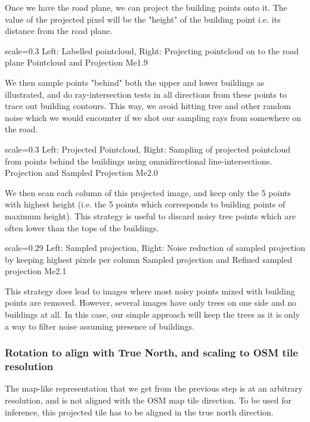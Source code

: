 Once we have the road plane, we can project the building points onto it. The value of the projected pixel will be the "height" of the building point i.e. its distance from the road plane. 

{scale=0.3}%
{Left: Labelled pointcloud, Right: Projecting pointcloud on to the road plane}%
{Pointcloud and Projection}%
{Me1.9}

We then sample points "behind" both the upper and lower buildings as illustrated, and do ray-intersection tests in all directions from these points to trace out building contours. This way, we avoid hitting tree and other random noise which we would encounter if we shot our sampling rays from somewhere on the road. 

{scale=0.3}%
{Left: Projected Pointcloud, Right: Sampling of projected pointcloud from points behind the buildings using omnidirectional line-intersections.}%
{Projection and Sampled Projection}%
{Me2.0}

We then scan each column of this projected image, and keep only the 5 points with highest height (i.e. the 5 points which corresponds to building points of maximum height). This strategy is useful to discard noisy tree points which are often lower than the tops of the buildings. 

{scale=0.29}%
{Left: Sampled projection, Right: Noise reduction of sampled projection by keeping highest pixels per column}%
{Sampled projection and Refined sampled projection}%
{Me2.1}

This strategy does lead to images where most noisy points mixed with building points are removed. However, several images have only trees on one side and no buildings at all. In this case, our simple approach will keep the trees as it is only a way to filter noise assuming presence of buildings. 

\pagebreak
\subsubsection{Rotation to align with True North, and scaling to OSM tile resolution}
The map-like representation that we get from the previous step is at an arbitrary resolution, and is not aligned with the OSM map tile direction. To be used for inference, this projected tile has to be aligned in the true north direction. 

